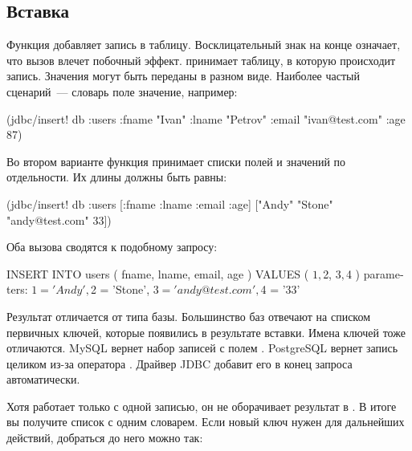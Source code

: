 \subsection{Вставка}


Функция  добавляет запись в таблицу. Восклицательный знак на конце означает, что вызов влечет побочный эффект.  принимает таблицу, в которую происходит запись. Значения могут быть переданы в разном виде. Наиболее частый сценарий~--- словарь поле \arr значение, например:

\begin{english}
  \begin{clojure}
(jdbc/insert! db :users
              {:fname "Ivan"
               :lname "Petrov"
               :email "ivan@test.com"
               :age 87})
  \end{clojure}
\end{english}

Во втором варианте функция принимает списки полей и значений по отдельности. Их длины должны быть равны:

\begin{english}
  \begin{clojure}
(jdbc/insert! db :users
              [:fname :lname :email :age]
              ["Andy" "Stone" "andy@test.com" 33])
  \end{clojure}
\end{english}

Оба вызова сводятся к подобному запросу:

\begin{english}
  \begin{sql}
INSERT INTO users ( fname, lname, email, age )
VALUES ( $1, $2, $3, $4 )
parameters:
  $1 = 'Andy', $2 = 'Stone',
  $3 = 'andy@test.com', $4 = '33'
  \end{sql}
\end{english}

Результат  отличается от типа базы. Большинство баз отвечают на  списком первичных ключей, которые появились в результате вставки. Имена ключей тоже отличаются. MySQL вернет набор записей с полем . PostgreSQL вернет запись целиком из-за оператора . Драйвер JDBC добавит его в конец запроса автоматически.


Хотя  работает только с одной записью, он не оборачивает результат в . В итоге вы получите список с одним словарем. Если новый ключ нужен для дальнейших действий, добраться до него можно так:

